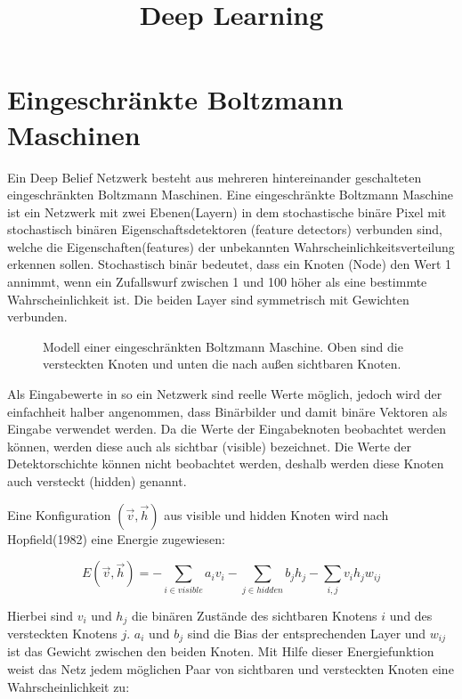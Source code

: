 \documentclass[12pt]{article}
\title{Deep Learning}
\begin{document}
	\maketitle

	\newpage

	\tableofcontents
	
	\newpage
	\section{Eingeschränkte Boltzmann Maschinen}
	
	Ein Deep Belief Netzwerk besteht aus mehreren hintereinander geschalteten eingeschränkten Boltzmann Maschinen. Eine eingeschränkte Boltzmann Maschine ist ein Netzwerk mit zwei Ebenen(Layern) in dem stochastische binäre Pixel mit stochastisch binären Eigenschaftsdetektoren (feature detectors) verbunden sind, welche die Eigenschaften(features) der unbekannten Wahrscheinlichkeitsverteilung erkennen sollen. Stochastisch binär bedeutet, dass ein Knoten (Node) den Wert 1 annimmt, wenn ein Zufallswurf zwischen 1 und 100 höher als eine bestimmte Wahrscheinlichkeit ist. Die beiden Layer sind symmetrisch mit Gewichten verbunden.
	
	
	\begin{figure}[H]
	
	\caption{Modell einer eingeschränkten Boltzmann Maschine. Oben sind die versteckten Knoten und unten die nach außen sichtbaren Knoten.}
	\end{figure}

Als Eingabewerte in so ein Netzwerk sind reelle Werte möglich, jedoch wird der einfachheit halber angenommen, dass Binärbilder und damit binäre Vektoren als Eingabe verwendet werden. Da die Werte der Eingabeknoten beobachtet werden können, werden diese auch als sichtbar (visible) bezeichnet. Die Werte der Detektorschichte können nicht beobachtet werden, deshalb werden diese Knoten auch versteckt (hidden) genannt.

Eine Konfiguration $(\vec{v},\vec{h})$ aus visible und hidden Knoten wird nach Hopfield(1982) eine Energie zugewiesen:

\begin{equation}
E(\vec{v},\vec{h})= - \sum_{i \in visible} a_iv_i- \sum_{j \in hidden} b_j h_j - \sum_{i,j} v_i h_j w_{ij}
\end{equation}

Hierbei sind $v_i$ und $h_j$ die binären Zustände des sichtbaren Knotens $i$ und des versteckten Knotens $j$. $a_i$ und $b_j$ sind die Bias der entsprechenden Layer und $w_{ij}$ ist das Gewicht zwischen den beiden Knoten. Mit Hilfe dieser Energiefunktion weist das Netz jedem möglichen Paar von sichtbaren und versteckten Knoten eine Wahrscheinlichkeit zu:
\end{document}
